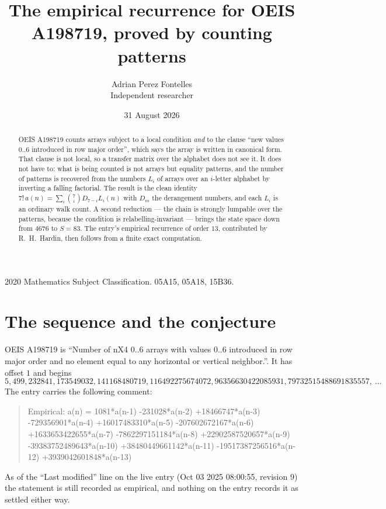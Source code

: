 \documentclass[11pt,a4paper]{article}
\title{The empirical recurrence for OEIS A198719, proved by counting patterns}
\author{Adrian Perez Fontelles\\ \small Independent researcher}
\date{31 August 2026}
\theoremstyle{plain}
\theoremstyle{definition}
\begin{document}
\maketitle

\begin{abstract}
OEIS A198719 counts arrays subject to a local condition \emph{and} to the clause ``new values
$0..6$ introduced in row major order'', which says the array is written in canonical
form. That clause is not local, so a transfer matrix over the alphabet does not see it. It
does not have to: what is being counted is not arrays but equality patterns, and the number
of patterns is recovered from the numbers $L_i$ of arrays over an $i$-letter alphabet by
inverting a falling factorial. The result is the clean identity
$7!\,a(n)=\sum_i\binom{7}{i}D_{7-i}L_i(n)$ with $D_m$ the derangement numbers,
and each $L_i$ is an ordinary walk count. A second reduction --- the chain is strongly
lumpable over the patterns, because the condition is relabelling-invariant --- brings the
state space down from $4676$ to $S=83$. The entry's empirical recurrence of order
$13$, contributed by R.~H.~Hardin, then follows from a finite exact computation.
\end{abstract}

\noindent\small 2020 Mathematics Subject Classification. 05A15, 05A18, 15B36.\normalsize

\section{The sequence and the conjecture}

OEIS A198719 is ``Number of nX4 0..6 arrays with values 0..6 introduced in row major order and no element equal to any horizontal or vertical neighbor.''. It has offset $1$ and begins
\[
5, 499, 232841, 173549032, 141168480719, 116492275674072, 96356630422085931, 79732515488691835557,\ \dots
\]
The entry carries the following comment:
\begin{quote}\small
Empirical: a(n) = 1081*a(n-1) -231028*a(n-2) +18466747*a(n-3) -729356901*a(n-4) +16017483310*a(n-5) -207602672167*a(n-6) +1633653422655*a(n-7) -7862297151184*a(n-8) +22902587520657*a(n-9) -39383752489643*a(n-10) +38480449661142*a(n-11) -19517387256516*a(n-12) +3939042601848*a(n-13)
\end{quote}
As of the ``Last modified'' line on the live entry (Oct 03 2025 08:00:55, revision 9) the statement is
still recorded as empirical, and nothing on the entry records it as settled either way.
\end{document}
